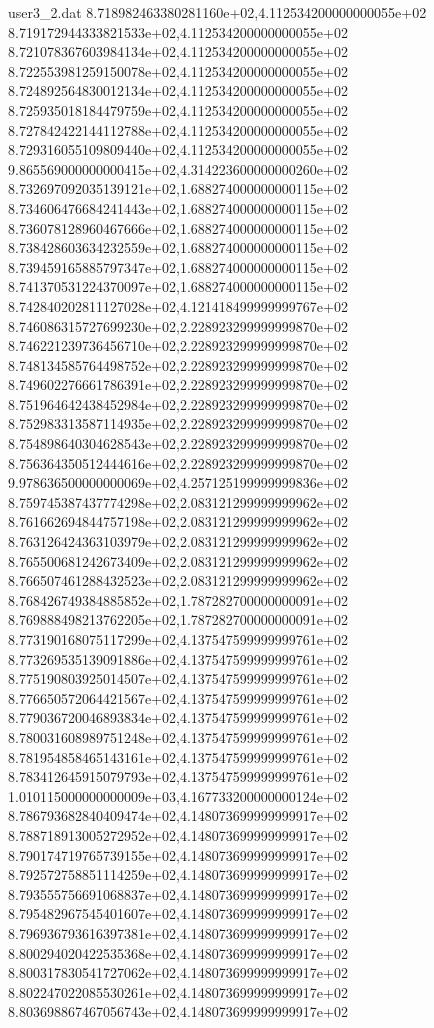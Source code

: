 \begin{filecontents}{user3_2.dat}
8.718982463380281160e+02,4.112534200000000055e+02
8.719172944333821533e+02,4.112534200000000055e+02
8.721078367603984134e+02,4.112534200000000055e+02
8.722553981259150078e+02,4.112534200000000055e+02
8.724892564830012134e+02,4.112534200000000055e+02
8.725935018184479759e+02,4.112534200000000055e+02
8.727842422144112788e+02,4.112534200000000055e+02
8.729316055109809440e+02,4.112534200000000055e+02
9.865569000000000415e+02,4.314223600000000260e+02
8.732697092035139121e+02,1.688274000000000115e+02
8.734606476684241443e+02,1.688274000000000115e+02
8.736078128960467666e+02,1.688274000000000115e+02
8.738428603634232559e+02,1.688274000000000115e+02
8.739459165885797347e+02,1.688274000000000115e+02
8.741370531224370097e+02,1.688274000000000115e+02
8.742840202811127028e+02,4.121418499999999767e+02
8.746086315727699230e+02,2.228923299999999870e+02
8.746221239736456710e+02,2.228923299999999870e+02
8.748134585764498752e+02,2.228923299999999870e+02
8.749602276661786391e+02,2.228923299999999870e+02
8.751964642438452984e+02,2.228923299999999870e+02
8.752983313587114935e+02,2.228923299999999870e+02
8.754898640304628543e+02,2.228923299999999870e+02
8.756364350512444616e+02,2.228923299999999870e+02
9.978636500000000069e+02,4.257125199999999836e+02
8.759745387437774298e+02,2.083121299999999962e+02
8.761662694844757198e+02,2.083121299999999962e+02
8.763126424363103979e+02,2.083121299999999962e+02
8.765500681242673409e+02,2.083121299999999962e+02
8.766507461288432523e+02,2.083121299999999962e+02
8.768426749384885852e+02,1.787282700000000091e+02
8.769888498213762205e+02,1.787282700000000091e+02
8.773190168075117299e+02,4.137547599999999761e+02
8.773269535139091886e+02,4.137547599999999761e+02
8.775190803925014507e+02,4.137547599999999761e+02
8.776650572064421567e+02,4.137547599999999761e+02
8.779036720046893834e+02,4.137547599999999761e+02
8.780031608989751248e+02,4.137547599999999761e+02
8.781954858465143161e+02,4.137547599999999761e+02
8.783412645915079793e+02,4.137547599999999761e+02
1.010115000000000009e+03,4.167733200000000124e+02
8.786793682840409474e+02,4.148073699999999917e+02
8.788718913005272952e+02,4.148073699999999917e+02
8.790174719765739155e+02,4.148073699999999917e+02
8.792572758851114259e+02,4.148073699999999917e+02
8.793555756691068837e+02,4.148073699999999917e+02
8.795482967545401607e+02,4.148073699999999917e+02
8.796936793616397381e+02,4.148073699999999917e+02
8.800294020422535368e+02,4.148073699999999917e+02
8.800317830541727062e+02,4.148073699999999917e+02
8.802247022085530261e+02,4.148073699999999917e+02
8.803698867467056743e+02,4.148073699999999917e+02

\end{filecontents}
